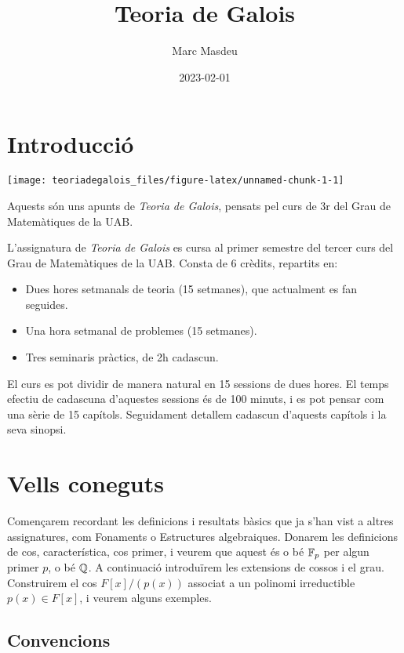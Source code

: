 \documentclass[
]{book}
\title{Teoria de Galois}
\author{Marc Masdeu}
\date{2023-02-01}
\providecommand{\tightlist}{%
  \setlength{\itemsep}{0pt}\setlength{\parskip}{0pt}}
\theoremstyle{definition}
\theoremstyle{definition}
\theoremstyle{definition}
\theoremstyle{definition}
\theoremstyle{remark}
\begin{document}
\maketitle

{
\setcounter{tocdepth}{1}
\tableofcontents
}
\hypertarget{introducciuxf3}{%
\chapter*{Introducció}\label{introducciuxf3}}

\texttt{[image: teoriadegalois\_files/figure-latex/unnamed-chunk-1-1]}

Aquests són uns apunts de \emph{Teoria de Galois}, pensats pel curs de 3r del Grau de Matemàtiques de la UAB.

L'assignatura de \emph{Teoria de Galois} es cursa al primer semestre del tercer curs del Grau de Matemàtiques de la UAB. Consta de 6 crèdits, repartits en:

\begin{itemize}
\tightlist
\item
  Dues hores setmanals de teoria (15 setmanes), que actualment es fan seguides.
\item
  Una hora setmanal de problemes (15 setmanes).
\item
  Tres seminaris pràctics, de 2h cadascun.
\end{itemize}

El curs es pot dividir de manera natural en 15 sessions de dues hores. El temps efectiu de cadascuna d'aquestes sessions és de 100 minuts, i es pot pensar com una sèrie de 15 capítols. Seguidament detallem cadascun d'aquests capítols i la seva sinopsi.

\hypertarget{pilot}{%
\chapter{Vells coneguts}\label{pilot}}

Començarem recordant les definicions i resultats bàsics que ja s'han vist a altres
assignatures, com Fonaments o Estructures algebraiques. Donarem les definicions de cos,
característica, cos primer, i veurem que aquest és o bé \(\mathbb{F}_p\) per algun primer \(p\), o bé \(\mathbb{Q}\).
A continuació introduïrem les extensions de cossos i el grau. Construirem el cos \(F[x]/(p(x))\) associat
a un polinomi irreductible \(p(x)\in F[x]\), i veurem alguns exemples.

\hypertarget{convencions}{%
\section{Convencions}\label{convencions}}
\end{document}
